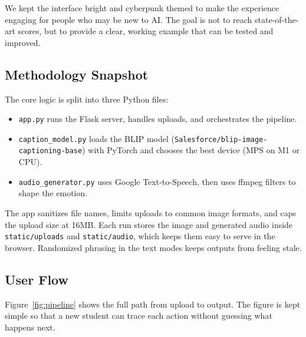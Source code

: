 \documentclass[11pt]{article}
\begin{document}
We kept the interface bright and cyberpunk themed to make the experience engaging for people who may be new to AI. The goal is not to reach state-of-the-art scores, but to provide a clear, working example that can be tested and improved.

\subsection{Methodology Snapshot}
The core logic is split into three Python files:
\begin{itemize}
    \item \texttt{app.py} runs the Flask server, handles uploads, and orchestrates the pipeline.
    \item \texttt{caption\_model.py} loads the BLIP model (\texttt{Salesforce/blip-image-captioning-base}) with PyTorch and chooses the best device (MPS on M1 or CPU).
    \item \texttt{audio\_generator.py} uses Google Text-to-Speech, then uses ffmpeg filters to shape the emotion.
\end{itemize}

The app sanitizes file names, limits uploads to common image formats, and caps the upload size at 16MB. Each run stores the image and generated audio inside \texttt{static/uploads} and \texttt{static/audio}, which keeps them easy to serve in the browser. Randomized phrasing in the text modes keeps outputs from feeling stale.

\subsection{User Flow}
Figure~\ref{fig:pipeline} shows the full path from upload to output. The figure is kept simple so that a new student can trace each action without guessing what happens next.
\end{document}
